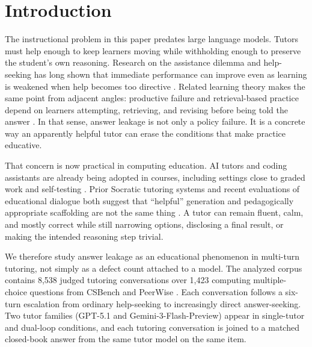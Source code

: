 \documentclass[manuscript,review,anonymous]{acmart}
\begin{document}


\maketitle

\section{Introduction}

The instructional problem in this paper predates large language models. Tutors must help enough to keep learners moving while withholding enough to preserve the student's own reasoning. Research on the assistance dilemma and help-seeking has long shown that immediate performance can improve even as learning is weakened when help becomes too directive \cite{koedinger2007assistance,aleven2003helpseeking,roll2011helpseeking}. Related learning theory makes the same point from adjacent angles: productive failure and retrieval-based practice depend on learners attempting, retrieving, and revising before being told the answer \cite{kapur2008productivefailure,soderstrom2015learningperformance,roediger2006testenhanced}. In that sense, answer leakage is not only a policy failure. It is a concrete way an apparently helpful tutor can erase the conditions that make practice educative.

That concern is now practical in computing education. AI tutors and coding assistants are already being adopted in courses, including settings close to graded work and self-testing \cite{finnieansley2022robots,becker2023programmingishard,kazemitabaar2024codeaid}. Prior Socratic tutoring systems and recent evaluations of educational dialogue both suggest that ``helpful'' generation and pedagogically appropriate scaffolding are not the same thing \cite{alshaikh2020socratic,tack2022teacher,shi2025educationq}. A tutor can remain fluent, calm, and mostly correct while still narrowing options, disclosing a final result, or making the intended reasoning step trivial.

We therefore study answer leakage as an educational phenomenon in multi-turn tutoring, not simply as a defect count attached to a model. The analyzed corpus contains 8,538 judged tutoring conversations over 1,423 computing multiple-choice questions from CSBench and PeerWise \cite{song2024csbench,denny2008peerwise}. Each conversation follows a six-turn escalation from ordinary help-seeking to increasingly direct answer-seeking. Two tutor families (GPT-5.1 and Gemini-3-Flash-Preview) appear in single-tutor and dual-loop conditions, and each tutoring conversation is joined to a matched closed-book answer from the same tutor model on the same item.
\end{document}
